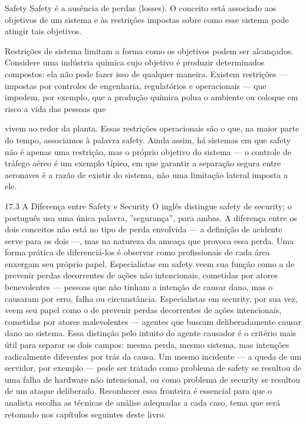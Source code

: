 Safety Safety é a ausência de perdas (losses). O conceito está associado aos objetivos de um sistema e às restrições impostas sobre como esse sistema pode atingir tais objetivos.

Restrições de sistema limitam a forma como os objetivos podem ser alcançados. Considere uma indústria química cujo objetivo é produzir determinados compostos: ela não pode fazer isso de qualquer maneira. Existem restrições — impostas por controles de engenharia, regulatórios e operacionais — que impedem, por exemplo, que a produção química polua o ambiente ou coloque em risco a vida das pessoas que

vivem ao redor da planta. Essas restrições operacionais são o que, na maior parte do tempo, associamos à palavra safety. Ainda assim, há sistemas em que safety não é apenas uma restrição, mas o próprio objetivo do sistema — o controle de tráfego aéreo é um exemplo típico, em que garantir a separação segura entre aeronaves é a razão de existir do sistema, não uma limitação lateral imposta a ele.

17.3 A Diferença entre Safety e Security O inglês distingue safety de security; o português usa uma única palavra, ”segurança”, para ambas. A diferença entre os dois conceitos não está no tipo de perda envolvida — a definição de acidente serve para os dois —, mas na natureza da ameaça que provoca essa perda. Uma forma prática de diferenciá-los é observar como profissionais de cada área enxergam seu próprio papel. Especialistas em safety veem sua função como a de prevenir perdas decorrentes de ações não intencionais, cometidas por atores benevolentes — pessoas que não tinham a intenção de causar dano, mas o causaram por erro, falha ou circunstância. Especialistas em security, por sua vez, veem seu papel como o de prevenir perdas decorrentes de ações intencionais, cometidas por atores malevolentes — agentes que buscam deliberadamente causar dano ao sistema. Essa distinção pelo intuito do agente causador é o critério mais útil para separar os dois campos: mesma perda, mesmo sistema, mas intenções radicalmente diferentes por trás da causa. Um mesmo incidente — a queda de um servidor, por exemplo — pode ser tratado como problema de safety se resultou de uma falha de hardware não intencional, ou como problema de security se resultou de um ataque deliberado. Reconhecer essa fronteira é essencial para que o analista escolha as técnicas de análise adequadas a cada caso, tema que será retomado nos capítulos seguintes deste livro.

